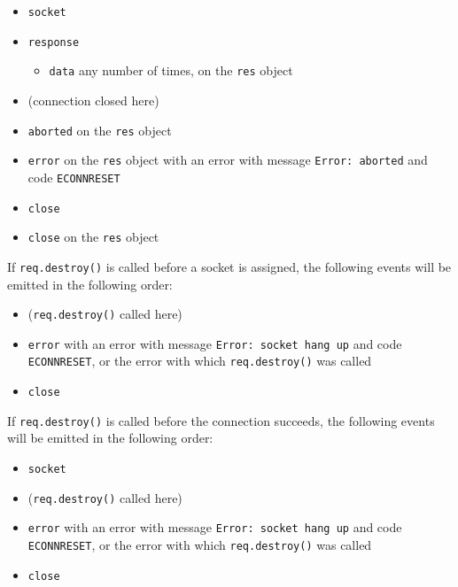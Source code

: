 \begin{itemize}
\tightlist
\item
  \texttt{\textquotesingle{}socket\textquotesingle{}}
\item
  \texttt{\textquotesingle{}response\textquotesingle{}}

  \begin{itemize}
  \tightlist
  \item
    \texttt{\textquotesingle{}data\textquotesingle{}} any number of
    times, on the \texttt{res} object
  \end{itemize}
\item
  (connection closed here)
\item
  \texttt{\textquotesingle{}aborted\textquotesingle{}} on the
  \texttt{res} object
\item
  \texttt{\textquotesingle{}error\textquotesingle{}} on the \texttt{res}
  object with an error with message
  \texttt{\textquotesingle{}Error:\ aborted\textquotesingle{}} and code
  \texttt{\textquotesingle{}ECONNRESET\textquotesingle{}}
\item
  \texttt{\textquotesingle{}close\textquotesingle{}}
\item
  \texttt{\textquotesingle{}close\textquotesingle{}} on the \texttt{res}
  object
\end{itemize}

If \texttt{req.destroy()} is called before a socket is assigned, the
following events will be emitted in the following order:

\begin{itemize}
\tightlist
\item
  (\texttt{req.destroy()} called here)
\item
  \texttt{\textquotesingle{}error\textquotesingle{}} with an error with
  message
  \texttt{\textquotesingle{}Error:\ socket\ hang\ up\textquotesingle{}}
  and code \texttt{\textquotesingle{}ECONNRESET\textquotesingle{}}, or
  the error with which \texttt{req.destroy()} was called
\item
  \texttt{\textquotesingle{}close\textquotesingle{}}
\end{itemize}

If \texttt{req.destroy()} is called before the connection succeeds, the
following events will be emitted in the following order:

\begin{itemize}
\tightlist
\item
  \texttt{\textquotesingle{}socket\textquotesingle{}}
\item
  (\texttt{req.destroy()} called here)
\item
  \texttt{\textquotesingle{}error\textquotesingle{}} with an error with
  message
  \texttt{\textquotesingle{}Error:\ socket\ hang\ up\textquotesingle{}}
  and code \texttt{\textquotesingle{}ECONNRESET\textquotesingle{}}, or
  the error with which \texttt{req.destroy()} was called
\item
  \texttt{\textquotesingle{}close\textquotesingle{}}
\end{itemize}

